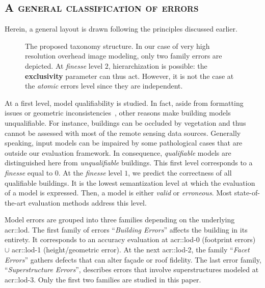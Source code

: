     \subsection{\textsc{A general classification of errors}}
        Herein, a general layout is drawn following the principles discussed earlier.

        \begin{figure}
            \begin{center}
                
                \caption{
                    \label{fig::taxonomy} 
                    The proposed taxonomy structure.
                    In our case of very high resolution overhead image modeling, only two family errors are depicted.
                    At \textit{finesse} level $2$, hierarchization is possible: the \textbf{exclusivity} parameter can thus act.
                    However, it is not the case at the \textit{atomic} errors level since they are independent.
                }
            \end{center}
        \end{figure}

        At a first level, model qualifiability is studied.
        In fact, aside from formatting issues or geometric inconsistencies~\parencite{ledoux2018val3dity}, other reasons make building models unqualifiable.
        For instance, buildings can be occluded by vegetation and thus cannot be assessed with most of the remote sensing data sources.
        Generally speaking, input models can be impaired by some pathological cases that are outside our evaluation framework.
        In consequence, \textit{qualifiable} models are distinguished here from \textit{unqualifiable} buildings.
        This first level corresponds to a \textit{finesse} equal to $0$. At the \textit{finesse} level $1$, we predict the correctness of all qualifiable buildings.
        It is the lowest semantization level at which the evaluation of a model is expressed.
        Then, a model is either \textit{valid} or \textit{erroneous}.
        Most state-of-the-art evaluation methods address this level.

        Model errors are grouped into three families depending on the underlying \gls{acr::lod}.
        The first family of errors ``\textit{Building Errors}'' affects the building in its entirety.
        It corresponds to an accuracy evaluation at \gls{acr::lod}-$0$ (footprint errors) $\cup$ \gls{acr::lod}-1 (height/geometric error).
        At the next \gls{acr::lod}-2, the family ``\textit{Facet Errors}'' gathers defects that can alter fa\c{c}ade or roof fidelity.
        The last error family, ``\textit{Superstructure Errors}'', describes errors that involve superstructures modeled at \gls{acr::lod}-3.
        Only the first two families are studied in this paper.

